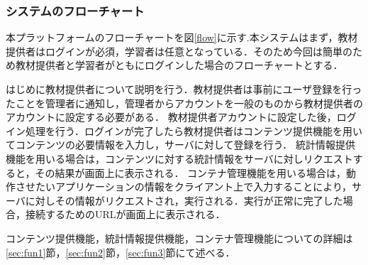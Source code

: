 \subsubsection{システムのフローチャート}
本プラットフォームのフローチャートを図\ref{flow}に示す.本システムはまず，教材提供者はログインが必須，学習者は任意となっている．そのため今回は簡単のため教材提供者と学習者がともにログインした場合のフローチャートとする．

はじめに教材提供者について説明を行う．教材提供者は事前にユーザ登録を行ったことを管理者に通知し，管理者からアカウントを一般のものから教材提供者のアカウントに設定する必要がある．
教材提供者アカウントに設定した後，ログイン処理を行う．ログインが完了したら教材提供者はコンテンツ提供機能を用いてコンテンツの必要情報を入力し，サーバに対して登録を行う．
統計情報提供機能を用いる場合は，コンテンツに対する統計情報をサーバに対しリクエストすると，その結果が画面上に表示される．
コンテナ管理機能を用いる場合は，動作させたいアプリケーションの情報をクライアント上で入力することにより，サーバに対しその情報がリクエストされ，実行される．実行が正常に完了した場合，接続するためのURLが画面上に表示される．

コンテンツ提供機能，統計情報提供機能，コンテナ管理機能についての詳細は\ref{sec:fun1}節，\ref{sec:fun2}節，\ref{sec:fun3}節にて述べる．
